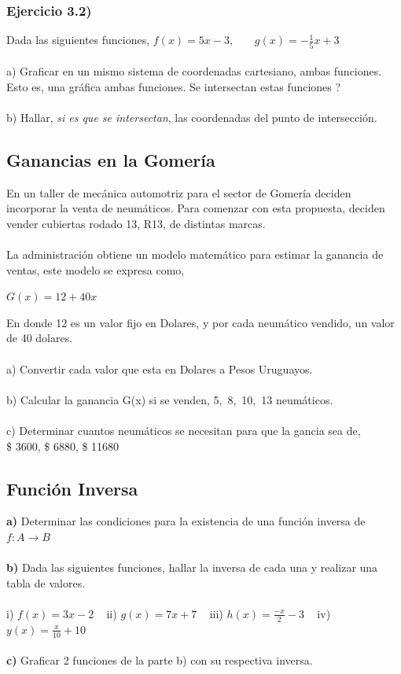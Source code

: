 \documentclass[11pt, a4paper]{article}
\begin{document}
\subsubsection*{Ejercicio 3.2) }
Dada las siguientes funciones, $f(x) = 5x - 3$, ~ ~ $\displaystyle g(x) = -\frac{1}{5}x + 3$ \\ \\ 
a) Graficar en un mismo sistema de coordenadas cartesiano, ambas funciones. Esto es, una gr\'afica ambas funciones. Se intersectan estas funciones ? \\ \\
b) Hallar, \textit{si es que se intersectan}, las coordenadas del punto de intersecci\'on. 


\subsection{ Ganancias en la Gomer\'ia }
En un taller de mec\'anica automotriz para el sector de Gomer\'ia deciden incorporar la venta de neum\'aticos. 
Para comenzar con esta propuesta, deciden vender cubiertas rodado 13, R13, de distintas marcas. \\ \\
La administraci\'on obtiene un modelo matem\'atico para estimar la ganancia de ventas, este modelo se expresa como, 
\begin{center}
    $ G(x) = 12 + 40x $
\end{center}
En donde 12 es un valor fijo en Dolares, y por cada neum\'atico vendido, un valor de 40 dolares. \\ \\
a) Convertir cada valor que esta en Dolares a Pesos Uruguayos. \\ \\
b) Calcular la ganancia G(x) si se venden, 5,~8,~10,~13 neum\'aticos. \\ \\
c) Determinar cuantos neum\'aticos se necesitan para que la gancia sea de, \\ \$ 3600, \$ 6880, \$ 11680

\subsection{ Funci\'on Inversa }

\textbf{ a) } Determinar las condiciones para la existencia de una funci\'on inversa de $f: A \to B $ \\ \\
\textbf{ b)  }
Dada las siguientes funciones, hallar la inversa de cada una y realizar una tabla de valores. \\ \\ 
i) $f(x) = 3x - 2$ ~ ii) $ g(x) = 7x + 7 $ ~ iii) $\displaystyle h(x) = \frac{-x}{2} - 3 $ ~ iv) $\displaystyle y(x) = \frac{x}{10}+10$ \\ \\
\textbf{ c) } Graficar 2 funciones de la parte b) con su respectiva inversa. 
\end{document}
